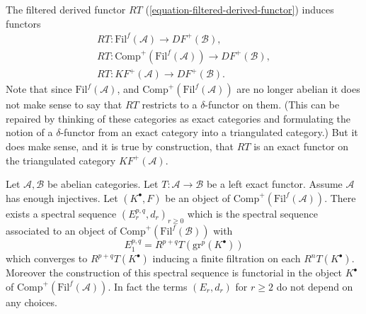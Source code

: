 \medskip\noindent
The filtered derived functor $RT$ (\ref{equation-filtered-derived-functor})
induces functors
$$
\begin{matrix}
RT : \text{Fil}^f(\mathcal{A}) \to DF^{+}(\mathcal{B}), \\
RT : \text{Comp}^{+}(\text{Fil}^f(\mathcal{A})) \to DF^{+}(\mathcal{B}), \\
RT : KF^{+}(\mathcal{A}) \to DF^{+}(\mathcal{B}).
\end{matrix}
$$
Note that since $\text{Fil}^f(\mathcal{A})$, and
$\text{Comp}^{+}(\text{Fil}^f(\mathcal{A}))$ are no longer
abelian it does not make sense to say that $RT$ restricts to
a $\delta$-functor on them. (This can be
repaired by thinking of these categories as exact categories and
formulating the notion of a $\delta$-functor from an exact category
into a triangulated category.)
But it does make sense, and it is true
by construction, that $RT$ is an exact functor on the triangulated
category $KF^{+}(\mathcal{A})$.

\begin{lemma}
\label{lemma-ss-filtered-derived}
Let $\mathcal{A}, \mathcal{B}$ be abelian categories.
Let $T : \mathcal{A} \to \mathcal{B}$ be a left exact functor.
Assume $\mathcal{A}$ has enough injectives.
Let $(K^\bullet, F)$ be an object of
$\text{Comp}^{+}(\text{Fil}^f(\mathcal{A}))$.
There exists a spectral sequence $(E_r^{p, q}, d_r)_{r\geq 0}$
which is the spectral sequence
associated to an object of
$\text{Comp}^{+}(\text{Fil}^f(\mathcal{B}))$
with
$$
E_1^{p, q} = R^{p + q}T(\text{gr}^p(K^\bullet))
$$
which converges to $R^{p + q}T(K^\bullet)$ inducing a finite
filtration on each $R^nT(K^\bullet)$. Moreover the construction
of this spectral sequence is functorial in the object
$K^\bullet$ of $\text{Comp}^{+}(\text{Fil}^f(\mathcal{A}))$.
In fact the terms $(E_r, d_r)$ for $r \geq 2$ do not depend
on any choices.
\end{lemma}


